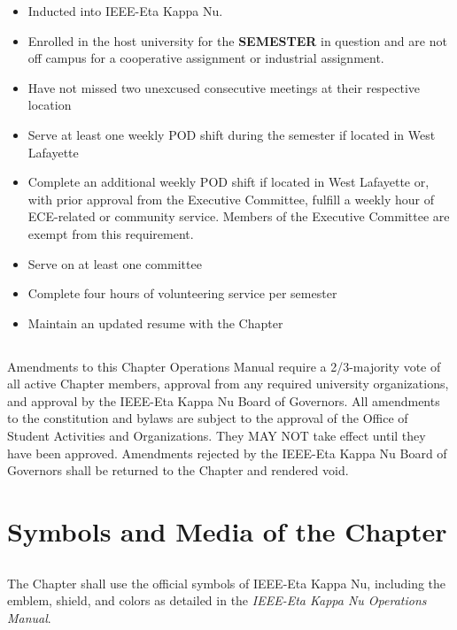 \documentclass[10pt, oneside]{article}
\begin{document}
\begin{itemize}
    \item Inducted into IEEE-Eta Kappa Nu.
    \item Enrolled in the host university for the \textbf{SEMESTER} in question and are not off campus for a cooperative assignment or industrial assignment.
    \item Have not missed two unexcused consecutive meetings at their respective location
    \item Serve at least one weekly POD shift during the semester if located in West Lafayette
    \item Complete an additional weekly POD shift if located in West Lafayette or, with prior approval from the Executive Committee, fulfill a weekly hour of ECE-related or community service. Members of the Executive Committee are exempt from this requirement.

    \item Serve on at least one committee
    \item Complete four hours of volunteering service per semester
    \item Maintain an updated resume with the Chapter
\end{itemize}

\subsection{}
Amendments to this Chapter Operations Manual require a 2/3-majority vote of all active Chapter members, approval from any required university organizations, and approval by the IEEE-Eta Kappa Nu Board of Governors. All amendments to the constitution and bylaws are subject to the approval of the Office of Student
Activities and Organizations. They MAY NOT take effect until they have been approved. Amendments rejected by the IEEE-Eta Kappa Nu Board of Governors shall be returned to the Chapter and rendered void.

\section{Symbols and Media of the Chapter}
\subsection{}

The Chapter shall use the official symbols of IEEE-Eta Kappa Nu, including the emblem, shield, and colors as detailed in the \textit{IEEE-Eta Kappa Nu Operations Manual}.
\end{document}
